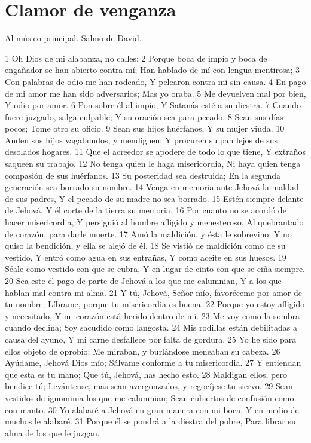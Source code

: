 \section*{Clamor de venganza}

Al músico principal. Salmo de David.

1 Oh Dios de mi alabanza, no calles;
2 Porque boca de impío y boca de engañador se han abierto contra mí;
Han hablado de mí con lengua mentirosa;
3 Con palabras de odio me han rodeado,
Y pelearon contra mí sin causa.
4 En pago de mi amor me han sido adversarios;
Mas yo oraba.
5 Me devuelven mal por bien,
Y odio por amor.
6 Pon sobre él al impío,
Y Satanás esté a su diestra.
7 Cuando fuere juzgado, salga culpable;
Y su oración sea para pecado.
8 Sean sus días pocos;
Tome otro su oficio.
9 Sean sus hijos huérfanos,
Y su mujer viuda.
10 Anden sus hijos vagabundos, y mendiguen;
Y procuren su pan lejos de sus desolados hogares.
11 Que el acreedor se apodere de todo lo que tiene,
Y extraños saqueen su trabajo.
12 No tenga quien le haga misericordia,
Ni haya quien tenga compasión de sus huérfanos.
13 Su posteridad sea destruida;
En la segunda generación sea borrado su nombre.
14 Venga en memoria ante Jehová la maldad de sus padres,
Y el pecado de su madre no sea borrado.
15 Estén siempre delante de Jehová,
Y él corte de la tierra su memoria,
16 Por cuanto no se acordó de hacer misericordia,
Y persiguió al hombre afligido y menesteroso,
Al quebrantado de corazón, para darle muerte.
17 Amó la maldición, y ésta le sobrevino;
Y no quiso la bendición, y ella se alejó de él.
18 Se vistió de maldición como de su vestido,
Y entró como agua en sus entrañas,
Y como aceite en sus huesos.
19 Séale como vestido con que se cubra,
Y en lugar de cinto con que se ciña siempre.
20 Sea este el pago de parte de Jehová a los que me calumnian,
Y a los que hablan mal contra mi alma.
21 Y tú, Jehová, Señor mío, favoréceme por amor de tu nombre;
Líbrame, porque tu misericordia es buena.
22 Porque yo estoy afligido y necesitado,
Y mi corazón está herido dentro de mí.
23 Me voy como la sombra cuando declina;
Soy sacudido como langosta.
24 Mis rodillas están debilitadas a causa del ayuno,
Y mi carne desfallece por falta de gordura.
25 Yo he sido para ellos objeto de oprobio;
Me miraban, y burlándose meneaban su cabeza.
26 Ayúdame, Jehová Dios mío;
Sálvame conforme a tu misericordia.
27 Y entiendan que esta es tu mano;
Que tú, Jehová, has hecho esto.
28 Maldigan ellos, pero bendice tú;
Levántense, mas sean avergonzados, y regocíjese tu siervo.
29 Sean vestidos de ignominia los que me calumnian;
Sean cubiertos de confusión como con manto.
30 Yo alabaré a Jehová en gran manera con mi boca,
Y en medio de muchos le alabaré.
31 Porque él se pondrá a la diestra del pobre,
Para librar su alma de los que le juzgan.

